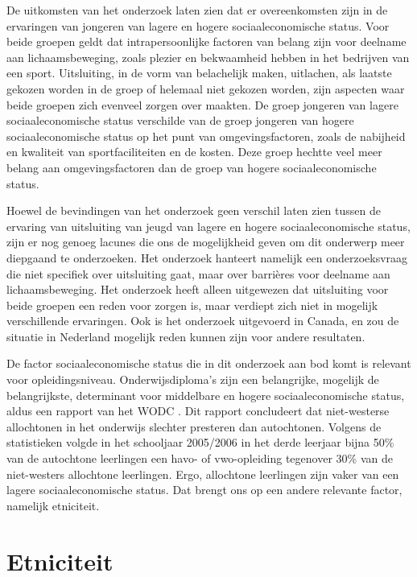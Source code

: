 \documentclass[a4paper,12pt]{memoir}
\begin{document}
De uitkomsten van het onderzoek laten zien dat er overeenkomsten zijn in de ervaringen van jongeren van lagere en hogere sociaaleconomische status. Voor beide groepen geldt dat intrapersoonlijke factoren van belang zijn voor deelname aan lichaamsbeweging, zoals plezier en bekwaamheid hebben in het bedrijven van een sport. Uitsluiting, in de vorm van belachelijk maken, uitlachen, als laatste gekozen worden in de groep of helemaal niet gekozen worden, zijn aspecten waar beide groepen zich evenveel zorgen over maakten. De groep jongeren van lagere sociaaleconomische status verschilde van de groep jongeren van hogere sociaaleconomische status op het punt van omgevingsfactoren, zoals de nabijheid en kwaliteit van sportfaciliteiten en de kosten. Deze groep hechtte veel meer belang aan omgevingsfactoren dan de groep van hogere sociaaleconomische status.

Hoewel de bevindingen van het onderzoek geen verschil laten zien tussen de ervaring van uitsluiting van jeugd van lagere en hogere sociaaleconomische status, zijn er nog genoeg lacunes die ons de mogelijkheid geven om dit onderwerp meer diepgaand te onderzoeken. Het onderzoek hanteert namelijk een onderzoeksvraag die niet specifiek over uitsluiting gaat, maar over barrières voor deelname aan lichaamsbeweging. Het onderzoek heeft alleen uitgewezen dat uitsluiting voor beide groepen een reden voor zorgen is, maar verdiept zich niet in mogelijk verschillende ervaringen. Ook is het onderzoek uitgevoerd in Canada, en zou de situatie in Nederland mogelijk reden kunnen zijn voor andere resultaten.

De factor sociaaleconomische status die in dit onderzoek aan bod komt is relevant voor opleidingsniveau. Onderwijsdiploma's zijn een belangrijke, mogelijk de belangrijkste, determinant voor middelbare en hogere sociaaleconomische status, aldus een rapport van het WODC \parencite{wodc}. Dit rapport concludeert dat niet-westerse allochtonen in het onderwijs slechter presteren dan autochtonen. Volgens de statistieken volgde in het schooljaar 2005/2006 in het derde leerjaar bijna 50\% van de autochtone leerlingen een havo- of vwo-opleiding tegenover 30\% van de niet-westers allochtone leerlingen. Ergo, allochtone leerlingen zijn vaker van een lagere sociaaleconomische status. Dat brengt ons op een andere relevante factor, namelijk etniciteit.

\section{Etniciteit}
\end{document}

